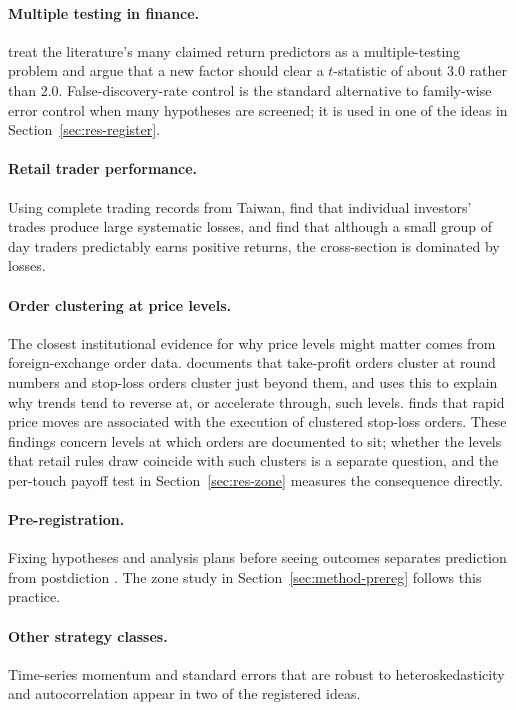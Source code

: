 \documentclass[11pt,a4paper]{article}
\begin{document}
\paragraph{Multiple testing in finance.}
\citet{harvey2016cross} treat the literature's many claimed return predictors as a multiple-testing
problem and argue that a new factor should clear a $t$-statistic of about 3.0 rather than 2.0.
False-discovery-rate control \citep{benjamini1995fdr} is the standard alternative to
family-wise error control when many hypotheses are screened; it is used in one of the ideas in
Section~\ref{sec:res-register}.

\paragraph{Retail trader performance.}
Using complete trading records from Taiwan, \citet{barber2009lose} find that individual investors'
trades produce large systematic losses, and \citet{barber2014daytrading} find that although a
small group of day traders predictably earns positive returns, the cross-section is dominated by
losses.

\paragraph{Order clustering at price levels.}
The closest institutional evidence for why price levels might matter comes from foreign-exchange
order data. \citet{osler2003currency} documents that take-profit orders cluster at round numbers
and stop-loss orders cluster just beyond them, and uses this to explain why trends tend to reverse
at, or accelerate through, such levels. \citet{osler2005stoploss} finds that rapid price moves are
associated with the execution of clustered stop-loss orders. These findings concern levels at
which orders are documented to sit; whether the levels that retail rules draw coincide with such
clusters is a separate question, and the per-touch payoff test in Section~\ref{sec:res-zone}
measures the consequence directly.

\paragraph{Pre-registration.}
Fixing hypotheses and analysis plans before seeing outcomes separates prediction from
postdiction \citep{nosek2018prereg}. The zone study in Section~\ref{sec:method-prereg} follows
this practice.

\paragraph{Other strategy classes.}
Time-series momentum \citep{moskowitz2012tsmom} and standard errors that are robust to
heteroskedasticity and autocorrelation \citep{newey1987hac} appear in two of the registered
ideas.
\end{document}
